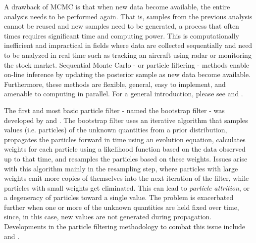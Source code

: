 \documentclass[useAMS,referee,usenatbib]{biom}
\begin{document}
A drawback of MCMC is that when new data become available, the entire analysis needs to be performed again.  That is, samples from the previous analysis cannot be reused and new samples need to be generated, a process that often times requires significant time and computing power.  This is computationally inefficient and impractical in fields where data are collected sequentially and need to be analyzed in real time such as tracking an aircraft using radar or monitoring the stock market.  Sequential Monte Carlo - or particle filtering - methods enable on-line inference by updating the posterior sample as new data become available.  Furthermore, these methods are flexible, general, easy to implement, and amenable to computing in parallel. For a general introduction, please see \cite{Douc:deFr:Gord:sequ:2001} and \cite{cappe2007overview}.

The first and most basic particle filter - named the bootstrap filter - was developed by \citet{Gord:Salm:Smit:nove:1993} and \citet{Kita:mont:1996}.  The bootstrap filter uses an iterative algorithm that samples values (i.e. particles) of the unknown quantities from a prior distribution, propagates the particles forward in time using an evolution equation, calculates weights for each particle using a likelihood function based on the data observed up to that time, and resamples the particles based on these weights.  Issues arise with this algorithm mainly in the resampling step, where particles with large weights emit more copies of themselves into the next iteration of the filter, while particles with small weights get eliminated.  This can lead to \emph{particle attrition}, or a degeneracy of particles toward a single value.  The problem is exacerbated further when one or more of the unknown quantities are held fixed over time, since, in this case, new values are not generated during propagation. Developments in the particle filtering methodology to combat this issue include \citet{Pitt:Shep:filt:1999} and \citet{Liu:West:comb:2001}.

\end{document}
